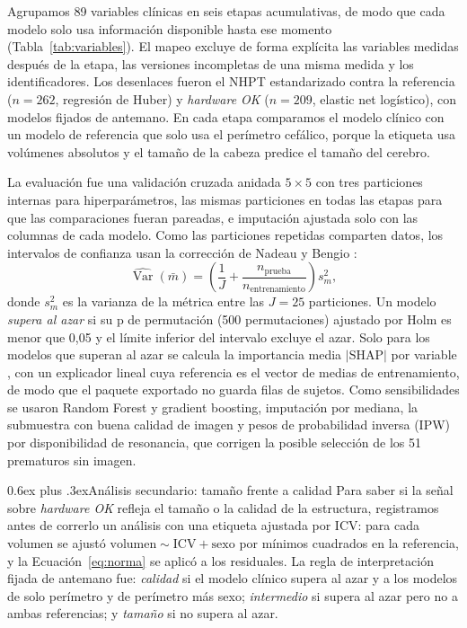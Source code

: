 \documentclass[conference,letterpaper,10pt]{IEEEtran}
\makeatletter
\def\subsection{\@startsection{subsection}{2}{\z@}{1.5ex plus 1ex minus .5ex}%
  {0.6ex plus .3ex}{\normalfont\normalsize\bfseries}}
\makeatother
\begin{document}
Agrupamos 89 variables clínicas en seis etapas acumulativas, de modo que cada modelo solo usa información disponible hasta ese momento (Tabla~\ref{tab:variables}). El mapeo excluye de forma explícita las variables medidas después de la etapa, las versiones incompletas de una misma medida y los identificadores. Los desenlaces fueron el NHPT estandarizado contra la referencia ($n=262$, regresión de Huber) y \emph{hardware OK} ($n=209$, elastic net logístico), con modelos fijados de antemano. En cada etapa comparamos el modelo clínico con un modelo de referencia que solo usa el perímetro cefálico, porque la etiqueta usa volúmenes absolutos y el tamaño de la cabeza predice el tamaño del cerebro.

La evaluación fue una validación cruzada anidada $5\times 5$ con tres particiones internas para hiperparámetros, las mismas particiones en todas las etapas para que las comparaciones fueran pareadas, e imputación ajustada solo con las columnas de cada modelo. Como las particiones repetidas comparten datos, los intervalos de confianza usan la corrección de Nadeau y Bengio \cite{nadeau2003}:
\begin{equation}
\widehat{\operatorname{Var}}(\bar m) = \left(\frac{1}{J} + \frac{n_{\text{prueba}}}{n_{\text{entrenamiento}}}\right) s_m^2,
\label{eq:nb}
\end{equation}
donde $s_m^2$ es la varianza de la métrica entre las $J=25$ particiones. Un modelo \emph{supera al azar} si su p de permutación (500 permutaciones) ajustado por Holm \cite{holm1979} es menor que 0,05 y el límite inferior del intervalo excluye el azar. Solo para los modelos que superan al azar se calcula la importancia media $|\text{SHAP}|$ por variable \cite{lundberg2017}, con un explicador lineal cuya referencia es el vector de medias de entrenamiento, de modo que el paquete exportado no guarda filas de sujetos. Como sensibilidades se usaron Random Forest y gradient boosting, imputación por mediana, la submuestra con buena calidad de imagen y pesos de probabilidad inversa (IPW) por disponibilidad de resonancia, que corrigen la posible selección de los 51 prematuros sin imagen.

\subsection{Análisis secundario: tamaño frente a calidad}
Para saber si la señal sobre \emph{hardware OK} refleja el tamaño o la calidad de la estructura, registramos antes de correrlo un análisis con una etiqueta ajustada por ICV: para cada volumen se ajustó $\text{volumen} \sim \text{ICV} + \text{sexo}$ por mínimos cuadrados en la referencia, y la Ecuación~\eqref{eq:norma} se aplicó a los residuales. La regla de interpretación fijada de antemano fue: \emph{calidad} si el modelo clínico supera al azar y a los modelos de solo perímetro y de perímetro más sexo; \emph{intermedio} si supera al azar pero no a ambas referencias; y \emph{tamaño} si no supera al azar.
\end{document}
